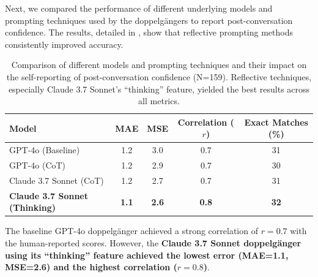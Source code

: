 Next, we compared the performance of different underlying models and prompting techniques used by the doppelgängers to report post-conversation confidence. The results, detailed in , show that reflective prompting methods consistently improved accuracy.


\begin{table}[!ht]
	\centering
	\begin{tabular}{l|cccc}
		\toprule
		\textbf{Model}                        & \textbf{MAE} & \textbf{MSE} & \textbf{Correlation ($r$)} & \textbf{Exact Matches (\%)} \\
		\midrule
		GPT-4o (Baseline)                     & 1.2          & 3.0          & 0.7                        & 31
		\\
		GPT-4o (CoT)                          & 1.2          & 2.9          & 0.7                        & 30                          \\
		Claude 3.7 Sonnet (CoT)               & 1.2          & 2.7          & 0.7                        & 31                          \\
		\textbf{Claude 3.7 Sonnet (Thinking)} & \textbf{1.1} & \textbf{2.6} & \textbf{0.8}               & \textbf{32}                 \\
		\bottomrule
	\end{tabular}
	\caption[Effect of LLM type and reasoning on synthetic smokers' self-reported confidence]{Comparison of different models and prompting techniques and their impact on the self-reporting of post-conversation confidence (N=159). Reflective techniques, especially Claude 3.7 Sonnet's ``thinking'' feature, yielded the best results across all metrics.}
	\label{tab:model_comparison}
\end{table}

The baseline GPT-4o doppelgänger achieved a strong correlation of \textbf{$r=0.7$} with the human-reported scores. However, the \textbf{Claude 3.7 Sonnet doppelgänger using its ``thinking'' feature achieved the lowest error (MAE=1.1, MSE=2.6) and the highest correlation ($r=0.8$)}.



